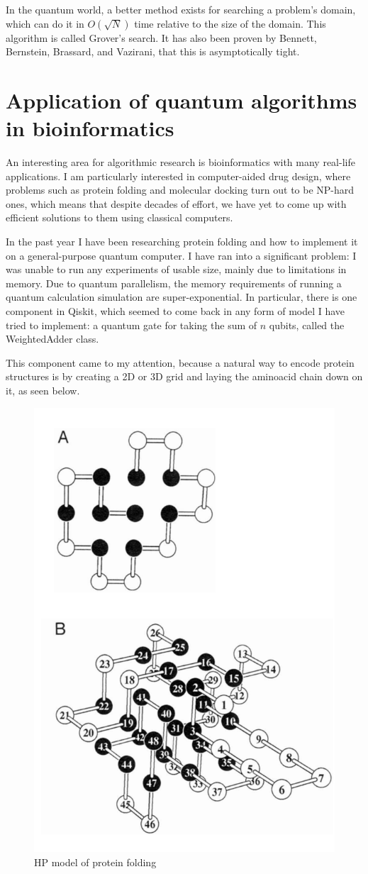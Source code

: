 In the quantum world, a better method exists for searching a problem's domain, which can do it in $O(\sqrt{N})$ time relative to the size of the domain. This algorithm is called Grover's search. It has also been proven by Bennett, Bernstein, Brassard, and Vazirani, that this is asymptotically tight\cite{bennett_strengths_1997}.

\section{Application of quantum algorithms in bioinformatics}

An interesting area for algorithmic research is bioinformatics with many real-life applications. I am particularly interested in computer-aided drug design, where problems such as protein folding\cite{crescenzi_complexity_1998} and molecular docking\cite{a_molecular_2018} turn out to be NP-hard ones, which means that despite decades of effort, we have yet to come up with efficient solutions to them using classical computers.

In the past year I have been researching protein folding and how to implement it on a general-purpose quantum computer. I have ran into a significant problem: I was unable to run any experiments of usable size, mainly due to limitations in memory. Due to quantum parallelism, the memory requirements of running a quantum calculation simulation are super-exponential. In particular, there is one component in Qiskit, which seemed to come back in any form of model I have tried to implement: a quantum gate for taking the sum of $n$ qubits, called the WeightedAdder class. 

This component came to my attention, because a natural way to encode protein structures is by creating a 2D or 3D grid and laying the aminoacid chain down on it\cite{dill_principles_2008}, as seen below.

\begin{figure}[H]
    \centering
    \includegraphics[width=0.5\linewidth]{figures/bioinformatics/hp_model.png}
    \caption{HP model of protein folding\cite{dill_principles_2008}}
\end{figure}

